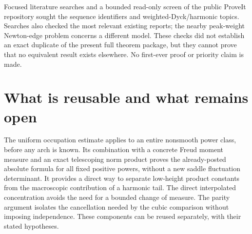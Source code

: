 \documentclass[11pt,letterpaper]{article}
\numberwithin{equation}{section}
\theoremstyle{remark}\newtheorem{remark}[theorem]{Remark}
\begin{document}
Focused literature searches and a bounded read-only screen of the public ProveIt repository sought the sequence identifiers and weighted-Dyck/harmonic topics. Searches also checked the most relevant existing reports; the nearby peak-weight Newton-edge problem concerns a different model. These checks did not establish an exact duplicate of the present full theorem package, but they cannot prove that no equivalent result exists elsewhere. No first-ever proof or priority claim is made.

\section{What is reusable and what remains open}\label{pwd:hm:sec:questions}
The uniform occupation estimate applies to an entire nonsmooth power class, before any arch is known. Its combination with a concrete Freud moment measure and an exact telescoping norm product proves the already-posted absolute formula for all fixed positive powers, without a new saddle fluctuation determinant. It provides a direct way to separate low-height product constants from the macroscopic contribution of a harmonic tail. The direct interpolated concentration avoids the need for a bounded change of measure. The parity argument isolates the cancellation needed by the cubic comparison without imposing independence. These components can be reused separately, with their stated hypotheses.
\end{document}
